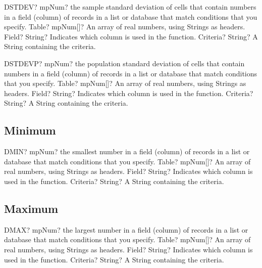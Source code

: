 \begin{mpFunctionsExtract}
	\mpWorksheetFunctionThreeNotImplemented
	{DSTDEV? mpNum? the sample standard deviation of cells that contain numbers in a field (column) of records in a list or database that match conditions that you specify.}
	{Table? mpNum[]? An array of real numbers, using Strings as headers.}
	{Field? String? Indicates which column is used in the function.}
	{Criteria? String? A String containing the criteria.}
\end{mpFunctionsExtract}

\vspace{0.6cm}
\begin{mpFunctionsExtract}
	\mpWorksheetFunctionThreeNotImplemented
	{DSTDEVP? mpNum? the population standard deviation of cells that contain numbers in a field (column) of records in a list or database that match conditions that you specify.}
	{Table? mpNum[]? An array of real numbers, using Strings as headers.}
	{Field? String? Indicates which column is used in the function.}
	{Criteria? String? A String containing the criteria.}
\end{mpFunctionsExtract}





\subsection{Minimum}

\begin{mpFunctionsExtract}
	\mpWorksheetFunctionThreeNotImplemented
	{DMIN? mpNum? the smallest number in a field (column) of records in a list or database that match conditions that you specify.}
	{Table? mpNum[]? An array of real numbers, using Strings as headers.}
	{Field? String? Indicates which column is used in the function.}
	{Criteria? String? A String containing the criteria.}
\end{mpFunctionsExtract}




\subsection{Maximum}

\begin{mpFunctionsExtract}
	\mpWorksheetFunctionThreeNotImplemented
	{DMAX? mpNum? the largest number in a field (column) of records in a list or database that match conditions that you specify.}
	{Table? mpNum[]? An array of real numbers, using Strings as headers.}
	{Field? String? Indicates which column is used in the function.}
	{Criteria? String? A String containing the criteria.}
\end{mpFunctionsExtract}





